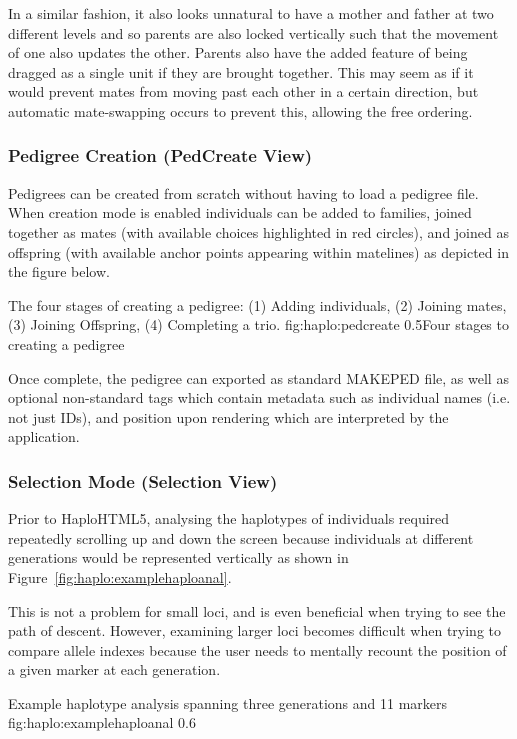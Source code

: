 In a similar fashion, it also looks unnatural to have a mother and father at two different levels and so  parents are also locked vertically such that the movement of one also updates the other. Parents also have the added feature of being dragged as a single unit if they are brought together. This may seem as if it would prevent mates from moving past each other in a certain direction, but automatic mate-swapping occurs to prevent this, allowing the free ordering.

\subsubsection{Pedigree Creation (PedCreate View)}

Pedigrees can be created from scratch without having to load a pedigree file. When creation mode is  enabled individuals can be added to families, joined together as mates (with available choices highlighted in red circles), and joined as offspring (with available anchor points appearing within matelines) as depicted in the figure below.

	{The four stages of creating a pedigree: (1) Adding individuals, (2) Joining mates, (3) Joining Offspring, (4) Completing a trio.}
	{fig:haplo:pedcreate}
	{0.5}{Four stages to creating a pedigree}
	
Once complete, the pedigree can exported as standard MAKEPED file, as well as optional non-standard tags which contain metadata such as individual names (i.e. not just IDs), and position upon rendering which are interpreted by the application.

\subsubsection{Selection Mode (Selection View)}

Prior to HaploHTML5, analysing the haplotypes of individuals required repeatedly scrolling up and down the screen because individuals at different generations would be represented vertically as shown in Figure~\ref{fig:haplo:examplehaploanal}.

This is not a problem for small loci, and is even beneficial when trying to see the path of descent. However, examining larger loci becomes difficult when trying to compare allele indexes because the user needs to mentally recount the position of a given marker at each generation.

	{Example haplotype analysis spanning three generations and 11 markers}
	{fig:haplo:examplehaploanal}
	{0.6}{}



